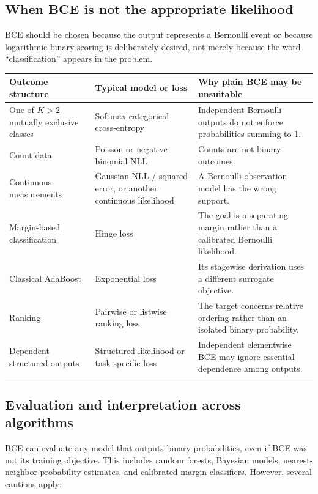 \documentclass[11pt]{article}
\newcommand{\rowrule}{\specialrule{0.20pt}{1.25pt}{1.25pt}}
\theoremstyle{definition}
\begin{document}
\clearpage
\thispagestyle{fancy}
\subsection{When BCE is not the appropriate likelihood}

BCE should be chosen because the output represents a Bernoulli event or because logarithmic binary scoring is deliberately desired, not merely because the word ``classification'' appears in the problem.

\begin{center}
\begin{tabularx}{0.96\textwidth}{>{\raggedright\arraybackslash}p{}>{\raggedright\arraybackslash}p{}X}
\toprule
\textbf{Outcome structure} & \textbf{Typical model or loss} & \textbf{Why plain BCE may be unsuitable} \\
\midrule
One of $K>2$ mutually exclusive classes & Softmax categorical cross-entropy & Independent Bernoulli outputs do not enforce probabilities summing to 1. \\
\rowrule
Count data & Poisson or negative-binomial NLL & Counts are not binary outcomes. \\
\rowrule
Continuous measurements & Gaussian NLL / squared error, or another continuous likelihood & A Bernoulli observation model has the wrong support. \\
\rowrule
Margin-based classification & Hinge loss & The goal is a separating margin rather than a calibrated Bernoulli likelihood. \\
\rowrule
Classical AdaBoost & Exponential loss & Its stagewise derivation uses a different surrogate objective. \\
\rowrule
Ranking & Pairwise or listwise ranking loss & The target concerns relative ordering rather than an isolated binary probability. \\
\rowrule
Dependent structured outputs & Structured likelihood or task-specific loss & Independent elementwise BCE may ignore essential dependence among outputs. \\
\bottomrule
\end{tabularx}
\end{center}

\subsection{Evaluation and interpretation across algorithms}

BCE can evaluate any model that outputs binary probabilities, even if BCE was not its training objective. This includes random forests, Bayesian models, nearest-neighbor probability estimates, and calibrated margin classifiers. However, several cautions apply:
\end{document}
